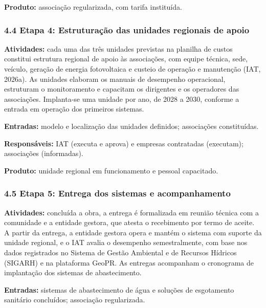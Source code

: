 \textbf{Produto:} associação regularizada, com tarifa instituída.

\subsubsection*{4.4 Etapa 4: Estruturação das unidades regionais de apoio}

\textbf{Atividades:} cada uma das três unidades previstas na planilha de custos constitui estrutura regional de apoio às associações, com equipe técnica, sede, veículo, geração de energia fotovoltaica e custeio de operação e manutenção (IAT, 2026a). As unidades elaboram os manuais de desempenho operacional, estruturam o monitoramento e capacitam os dirigentes e os operadores das associações. Implanta-se uma unidade por ano, de 2028 a 2030, conforme a entrada em operação dos primeiros sistemas.

\textbf{Entradas:} modelo e localização das unidades definidos; associações constituídas.

\textbf{Responsáveis:} IAT (executa e aprova) e empresas contratadas (executam); associações (informadas).

\textbf{Produto:} unidade regional em funcionamento e pessoal capacitado.


\subsubsection*{4.5 Etapa 5: Entrega dos sistemas e acompanhamento}

\textbf{Atividades:} concluída a obra, a entrega é formalizada em reunião técnica com a comunidade e a entidade gestora, que atesta o recebimento por termo de aceite. A partir da entrega, a entidade gestora opera e mantém o sistema com suporte da unidade regional, e o IAT avalia o desempenho semestralmente, com base nos dados registrados no Sistema de Gestão Ambiental e de Recursos Hídricos (SIGARH) e na plataforma GeoPR. As entregas acompanham o cronograma de implantação dos sistemas de abastecimento.

\textbf{Entradas:} sistemas de abastecimento de água e soluções de esgotamento sanitário concluídos; associação regularizada.

